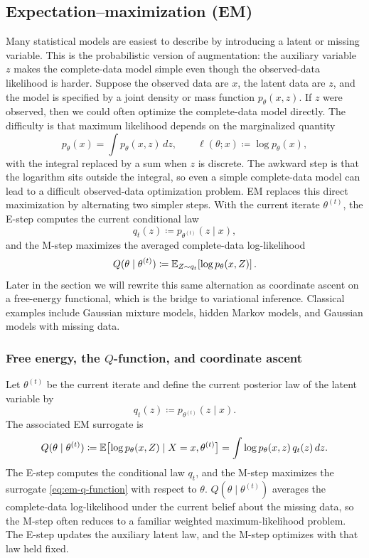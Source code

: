 \subsection{Expectation--maximization (EM)}
\label{subsec:expectation-maximization}

Many statistical models are easiest to describe by introducing a latent or missing variable.
This is the probabilistic version of augmentation: the auxiliary variable $z$ makes the complete-data model simple even though the observed-data likelihood is harder.
Suppose the observed data are $x$, the latent data are $z$, and the model is specified by a joint density or mass function $p_\theta(x,z)$.
If $z$ were observed, then we could often optimize the complete-data model directly.
The difficulty is that maximum likelihood depends on the marginalized quantity
\[
  p_\theta(x) = \int p_\theta(x,z)\,dz,
  \qquad
  \ell(\theta;x) \coloneqq \log p_\theta(x),
\]
with the integral replaced by a sum when $z$ is discrete.
The awkward step is that the logarithm sits outside the integral, so even a simple complete-data model can lead to a difficult observed-data optimization problem.
EM replaces this direct maximization by alternating two simpler steps.
With the current iterate \(\theta^{(t)}\), the E-step computes the current conditional law
\[
  q_t(z)\coloneqq p_{\theta^{(t)}}(z\mid x),
\]
and the M-step maximizes the averaged complete-data log-likelihood
\[
  Q(\theta\mid \theta^{(t)})
  \coloneqq
  \mathbb{E}_{Z\sim q_t}\!\left[\log p_\theta(x,Z)\right].
\]
Later in the section we will rewrite this same alternation as coordinate ascent on a free-energy functional, which is the bridge to variational inference.
Classical examples include Gaussian mixture models, hidden Markov models, and Gaussian models with missing data.

\subsubsection{Free energy, the \texorpdfstring{$Q$}{Q}-function, and coordinate ascent}
\label{subsubsec:em-q-function}

Let $\theta^{(t)}$ be the current iterate and define the current posterior law of the latent variable by
\[
  q_t(z) \coloneqq p_{\theta^{(t)}}(z\mid x).
\]
The associated EM surrogate is
\begin{equation}
  Q(\theta\mid \theta^{(t)})
  \coloneqq
  \mathbb{E}\bigl[\log p_\theta(x,Z)\mid X=x,\theta^{(t)}\bigr]
  =
  \int \log p_\theta(x,z)\,q_t(z)\,dz.
  \label{eq:em-q-function}
\end{equation}
The E-step computes the conditional law $q_t$, and the M-step maximizes the surrogate \eqref{eq:em-q-function} with respect to $\theta$.
$Q(\theta\mid \theta^{(t)})$ averages the complete-data log-likelihood under the current belief about the missing data, so the M-step often reduces to a familiar weighted maximum-likelihood problem.
The E-step updates the auxiliary latent law, and the M-step optimizes with that law held fixed.


